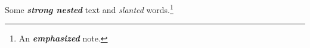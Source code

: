 \documentclass{article}
\let\textit\textsl
\renewcommand{\emph}[1]{\textbf{\textit{#1}}}
\begin{document}
Some \emph{strong \emph{nested}} text and \textit{slanted} words.\footnote{An \emph{emphasized} note.}
\end{document}
